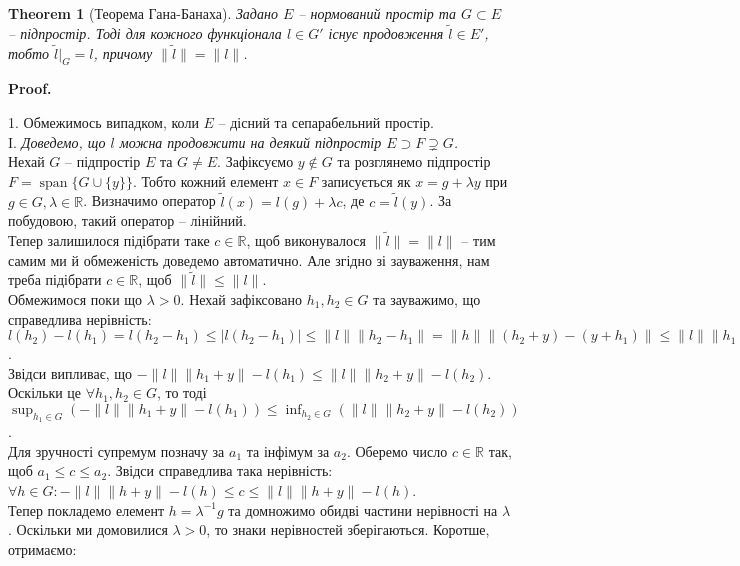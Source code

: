 \documentclass[a4paper, 10pt]{article}
\makeatletter
\theoremstyle{theoremdd}
\newtheorem{theorem}{Theorem}[subsection]
\theoremstyle{theoremdd}
\theoremstyle{theoremdd}
\theoremstyle{theoremdd}
\theoremstyle{theoremdd}
\theoremstyle{theoremdd}
\theoremstyle{theoremdd}
\theoremstyle{theoremdd}
\renewenvironment{proof}[1][Proof.\\]{\par
\pushQED{\hfill \qed}%
\normalfont \topsep6\p@\@plus6\p@\relax
\trivlist
\item\relax
{\bfseries
#1\@addpunct{.}}\hspace\labelsep\ignorespaces
}{%
\popQED\endtrivlist\@endpefalse
}
\DeclareMathOperator{\linspan}{span}
\makeatother
\begin{document}
\begin{theorem}[Теорема Гана-Банаха]
Задано $E$ -- нормований простір та $G \subset E$ -- підпростір. Тоді для кожного функціонала $l \in G'$ існує продовження $\tilde{l} \in E'$, тобто $\tilde{l}|_G = l$, причому $\| \tilde{l} \| = \|l\|$.
\end{theorem}

\begin{proof}
1. Обмежимось випадком, коли $E$ -- дісний та сепарабельний простір.\\
I. \textit{Доведемо, що $l$ можна продовжити на деякий підпростір $E \supset F \supsetneq G$.}\\
Нехай $G$ -- підпростір $E$ та $G \neq E$. Зафіксуємо $y \notin G$ та розглянемо підпростір $F = \linspan\{G \cup \{y\}\}$. Тобто кожний елемент $x \in F$ записується як $x = g + \lambda y$ при $g \in G, \lambda \in \mathbb{R}$. Визначимо оператор $\tilde{l}(x) = l(g) + \lambda c$, де $c = \tilde{l}(y)$. За побудовою, такий оператор -- лінійний.\\
Тепер залишилося підібрати таке $c \in \mathbb{R}$, щоб виконувалося $\|\tilde{l}\| = \|l\|$ -- тим самим ми й обмеженість доведемо автоматично. Але згідно зі зауваження, нам треба підібрати $c \in \mathbb{R}$, щоб $\|\tilde{l}\| \leq \|l\|$.\\
Обмежимося поки що $\lambda > 0$. Нехай зафіксовано $h_1,h_2 \in G$ та зауважимо, що справедлива нерівність:\\
$l(h_2) - l(h_1) = l(h_2-h_1) \leq |l(h_2-h_1)| \leq \|l\| \|h_2 - h_1\| = \|h \| \|(h_2+y) - (y+h_1)\| \leq \|l\| \|h_1+y\| + \|l\| \|h_2+y\|$.\\
Звідси випливає, що $-\|l\| \|h_1+y\| - l(h_1) \leq \|l\| \|h_2+y\| - l(h_2)$.\\
Оскільки це $\forall h_1,h_2 \in G$, то тоді $\displaystyle\sup_{h_1 \in G} (-\|l\| \|h_1+y\| - l(h_1)) \leq \inf_{h_2 \in G} ( \|l\| \|h_2+y\| - l(h_2))$.\\
Для зручності супремум позначу за $a_1$ та інфімум за $a_2$. Оберемо число $c \in \mathbb{R}$ так, щоб $a_1 \leq c \leq a_2$. Звідси справедлива така нерівність:\\
$\forall h \in G: -\|l\| \|h+y\| - l(h) \leq c \leq \|l\| \|h+y\| - l(h)$.\\
Тепер покладемо елемент $h = \lambda^{-1}g$ та домножимо обидві частини нерівності на $\lambda$. Оскільки ми домовилися $\lambda > 0$, то знаки нерівностей зберігаються. Коротше, отримаємо:\\

\end{proof}
\end{document}
